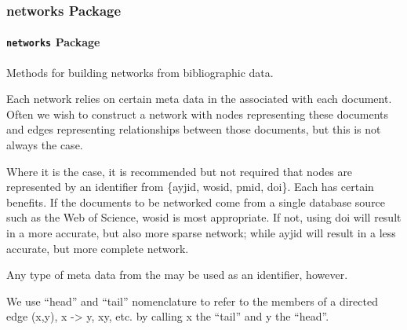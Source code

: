 \documentclass[letterpaper,10pt,english]{sphinxmanual}
\begin{document}
\subsubsection{networks Package}
\label{tethne.networks:networks-package}\label{tethne.networks::doc}

\paragraph{\texttt{networks} Package}
\label{tethne.networks:id1}\label{tethne.networks:module-tethne.networks}
Methods for building networks from bibliographic data.

Each network relies on certain meta data in the {\hyperref[tethne:tethne.data.Paper]{}} associated with
each document. Often we wish to construct a network with nodes representing
these documents and edges representing relationships between those documents,
but this is not always the case.

Where it is the case, it is recommended but not required that nodes are
represented by an identifier from \{ayjid, wosid, pmid, doi\}. Each has certain
benefits. If the documents to be networked come from a single database source
such as the Web of Science, wosid is most appropriate. If not, using doi
will result in a more accurate, but also more sparse network; while ayjid
will result in a less accurate, but more complete network.

Any type of meta data from the {\hyperref[tethne:tethne.data.Paper]{}} may be used as an identifier,
however.

We use ``head'' and ``tail'' nomenclature to refer to the members of a directed
edge (x,y), x -\textgreater{} y, xy, etc. by calling x the ``tail'' and y the ``head''.
\end{document}
